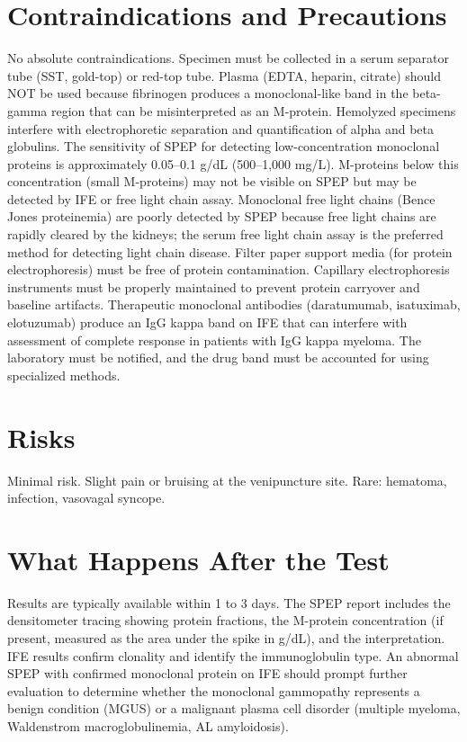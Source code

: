 \section*{Contraindications and Precautions}
No absolute contraindications. Specimen must be collected in a serum separator tube (SST, gold-top) or red-top tube. Plasma (EDTA, heparin, citrate) should NOT be used because fibrinogen produces a monoclonal-like band in the beta-gamma region that can be misinterpreted as an M-protein. Hemolyzed specimens interfere with electrophoretic separation and quantification of alpha and beta globulins. The sensitivity of SPEP for detecting low-concentration monoclonal proteins is approximately 0.05--0.1 g/dL (500--1,000 mg/L). M-proteins below this concentration (small M-proteins) may not be visible on SPEP but may be detected by IFE or free light chain assay. Monoclonal free light chains (Bence Jones proteinemia) are poorly detected by SPEP because free light chains are rapidly cleared by the kidneys; the serum free light chain assay is the preferred method for detecting light chain disease. Filter paper support media (for protein electrophoresis) must be free of protein contamination. Capillary electrophoresis instruments must be properly maintained to prevent protein carryover and baseline artifacts. Therapeutic monoclonal antibodies (daratumumab, isatuximab, elotuzumab) produce an IgG kappa band on IFE that can interfere with assessment of complete response in patients with IgG kappa myeloma. The laboratory must be notified, and the drug band must be accounted for using specialized methods.

\section*{Risks}
Minimal risk. Slight pain or bruising at the venipuncture site. Rare: hematoma, infection, vasovagal syncope.

\section*{What Happens After the Test}
Results are typically available within 1 to 3 days. The SPEP report includes the densitometer tracing showing protein fractions, the M-protein concentration (if present, measured as the area under the spike in g/dL), and the interpretation. IFE results confirm clonality and identify the immunoglobulin type. An abnormal SPEP with confirmed monoclonal protein on IFE should prompt further evaluation to determine whether the monoclonal gammopathy represents a benign condition (MGUS) or a malignant plasma cell disorder (multiple myeloma, Waldenstrom macroglobulinemia, AL amyloidosis).

